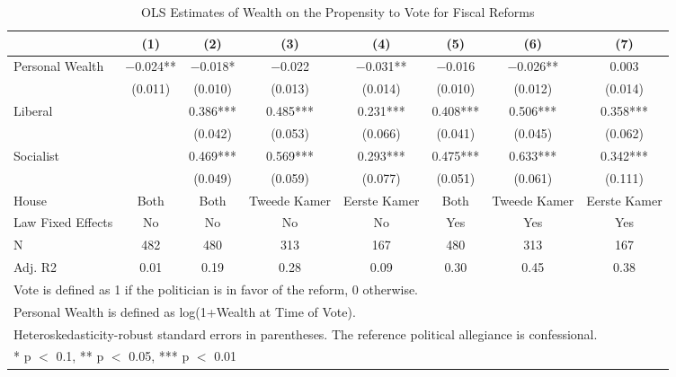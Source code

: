 \begin{table}

\caption{\label{tab:baseline_ols}OLS Estimates of Wealth on the Propensity to Vote for Fiscal Reforms}
\centering
\begin{tabular}[t]{lccccccc}
\toprule
  & (1) & (2) & (3) & (4) & (5) & (6) & (7)\\
\midrule
Personal Wealth & \num{-0.024}** & \num{-0.018}* & \num{-0.022} & \num{-0.031}** & \num{-0.016} & \num{-0.026}** & \num{0.003}\\
 & (\num{0.011}) & (\num{0.010}) & (\num{0.013}) & (\num{0.014}) & (\num{0.010}) & (\num{0.012}) & (\num{0.014})\\
Liberal &  & \num{0.386}*** & \num{0.485}*** & \num{0.231}*** & \num{0.408}*** & \num{0.506}*** & \num{0.358}***\\
 &  & (\num{0.042}) & (\num{0.053}) & (\num{0.066}) & (\num{0.041}) & (\num{0.045}) & (\num{0.062})\\
Socialist &  & \num{0.469}*** & \num{0.569}*** & \num{0.293}*** & \num{0.475}*** & \num{0.633}*** & \num{0.342}***\\
 &  & (\num{0.049}) & (\num{0.059}) & (\num{0.077}) & (\num{0.051}) & (\num{0.061}) & (\num{0.111})\\
\midrule
House & Both & Both & Tweede Kamer & Eerste Kamer & Both & Tweede Kamer & Eerste Kamer\\
Law Fixed Effects & No & No & No & No & Yes & Yes & Yes\\
N & \num{482} & \num{480} & \num{313} & \num{167} & \num{480} & \num{313} & \num{167}\\
Adj. R2 & \num{0.01} & \num{0.19} & \num{0.28} & \num{0.09} & \num{0.30} & \num{0.45} & \num{0.38}\\
\bottomrule
\multicolumn{8}{l}{\rule{0pt}{1em}Vote is defined as 1 if the politician is in favor of the reform, 0 otherwise.}\\
\multicolumn{8}{l}{\rule{0pt}{1em}Personal Wealth is defined as log(1+Wealth at Time of Vote).}\\
\multicolumn{8}{l}{\rule{0pt}{1em}Heteroskedasticity-robust standard errors in parentheses. The reference political allegiance is confessional.}\\
\multicolumn{8}{l}{\rule{0pt}{1em}* p $<$ 0.1, ** p $<$ 0.05, *** p $<$ 0.01}\\
\end{tabular}
\end{table}
